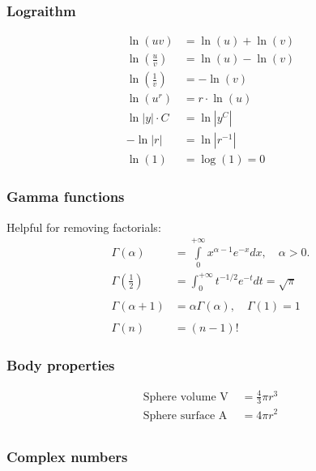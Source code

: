 \subsubsection{Lograithm}
\begin{align*}
    \ln(uv)                     & =\ln(u)+\ln(v) \\
    \ln\left(\frac{u}{v}\right) & =\ln(u)-\ln(v) \\
    \ln\left(\frac{1}{v}\right) & =-\ln(v)       \\
    \ln(u^r)                    & =r\cdot \ln(u) \\
    \ln |y|\cdot C              & = \ln |y^C|    \\
    - \ln |r|                   & = \ln|r^{-1}|  \\
    \ln(1)                      & = \log(1) = 0
\end{align*}


\subsubsection{Gamma functions}
Helpful for removing factorials:
\begin{align*}
    \Gamma(\alpha)             & =\int\limits_{0}^{+\infty}x^{\alpha-1}e^{-x}dx,\quad\alpha>0. \\
    \Gamma\left(\frac12\right) & =\int_0^{+\infty}t^{-1/2}e^{-t}dt=\sqrt{\pi}                  \\ \\
    \Gamma(\alpha+1)           & =\alpha\Gamma(\alpha),\quad \Gamma(1)=1                       \\ \\
    \Gamma(n)                  & =(n-1)!
\end{align*}

\subsubsection{Body properties}
\begin{align*}
    \text{Sphere volume V }  & = \frac{4}{3}\pi r^3 \\
    \text{Sphere surface A } & = 4\pi r^2           \\
\end{align*}

\subsubsection{Complex numbers}

